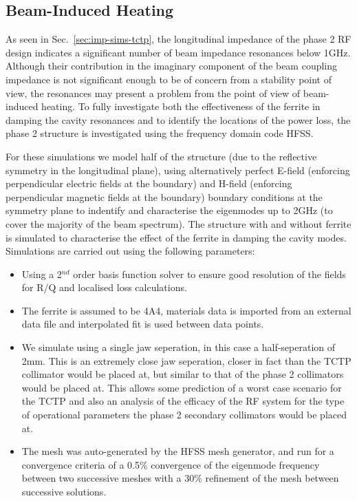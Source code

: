 \subsection{Beam-Induced Heating}
\label{sec:beam-heating-tctp}

As seen in Sec.~\ref{sec:imp-sims-tctp}, the longitudinal impedance of the phase 2 RF design indicates a significant number of beam impedance resonances below 1GHz. Although their contribution in the imaginary component of the beam coupling impedance is not significant enough to be of concern from a stability point of view, the resonances may present a problem from the point of view of beam-induced heating. To fully investigate both the effectiveness of the ferrite in damping the cavity resonances and to identify the locations of the power loss, the phase 2 structure is investigated using the frequency domain code HFSS. 

For these simulations we model half of the structure (due to the reflective symmetry in the longitudinal plane), using alternatively perfect E-field (enforcing perpendicular electric fields at the boundary) and H-field (enforcing perpendicular magnetic fields at the boundary) boundary conditions at the symmetry plane to indentify and characterise the eigenmodes up to 2GHz (to cover the majority of the beam spectrum). The structure with and without ferrite is simulated to characterise the effect of the ferrite in damping the cavity modes. Simulations are carried out using the following parameters:

\begin{itemize}
\item{Using a 2$^{nd}$ order basis function solver to ensure good resolution of the fields for R/Q and localised loss calculations.}
\item{The ferrite is assumed to be 4A4, materials data is imported from an external data file and interpolated fit is used between data points.}
\item{We simulate using a single jaw seperation, in this case a half-seperation of 2mm. This is an extremely close jaw seperation, closer in fact than the TCTP collimator would be placed at, but similar to that of the phase 2 collimators would be placed at. This allows some prediction of a worst case scenario for the TCTP and also an analysis of the efficacy of the RF system for the type of operational parameters the phase 2 secondary collimators would be placed at.}
\item{The mesh was auto-generated by the HFSS mesh generator, and run for a convergence criteria of a 0.5\% convergence of the eigenmode frequency between two successive meshes with a 30\% refinement of the mesh between successive solutions.}
\end{itemize}

